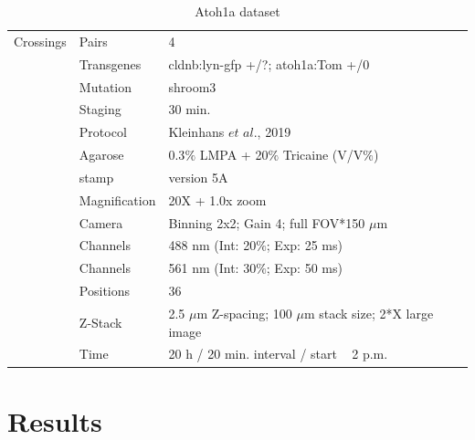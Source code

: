 \documentclass[11pt,singlespacinge,twoside]{reedthesis} %
\theoremstyle{definition}
\theoremstyle{definition}
\theoremstyle{definition}
\theoremstyle{remark}
\begin{document}
\begin{table}[!h]

\caption{\label{tab:imgdatato}Atoh1a dataset}
\centering
\begin{tabu} to 
\toprule
{}  Crossings & Pairs & 4\\
 & Transgenes & cldnb:lyn-gfp +/?; atoh1a:Tom +/0\\

   & Mutation & shroom3\\

 & Staging & 30 min.\\

   & Protocol & Kleinhans $\textit{et al.}$, 2019\\

 & Agarose & 0.3$\%$ LMPA + 20$\%$ Tricaine (V/V$\%$)\\

   & stamp & version 5A\\

 & Magnification & 20X + 1.0x zoom\\

   & Camera & Binning 2x2; Gain 4; full FOV*150 $\mu$m\\

 & Channels & 488 nm (Int: 20$\%$; Exp: 25 ms)\\

   & Channels & 561 nm (Int: 30$\%$; Exp: 50 ms)\\

 & Positions & 36\\

   & Z-Stack & 2.5 $\mu$m Z-spacing; 100 $\mu$m stack size; 2*X large image\\

 & Time & 20 h / 20 min. interval / start ~ 2 p.m.\\
\bottomrule
\end{tabu}
\end{table}
\hypertarget{res}{%
\chapter{Results}\label{res}}
\end{document}
